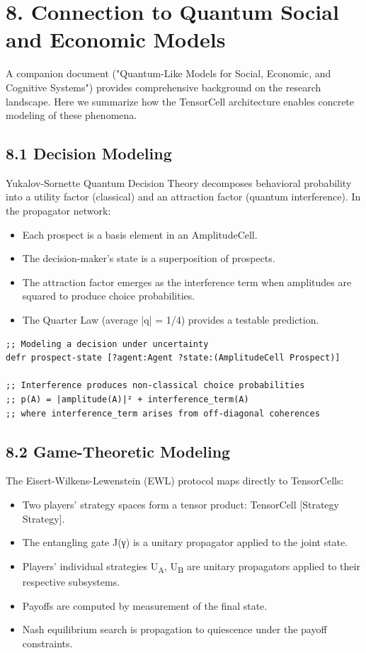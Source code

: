 \documentclass[11pt]{article}
\begin{document}
\section{8. Connection to Quantum Social and Economic Models}
\label{sec:org4938a41}

A companion document ("Quantum-Like Models for Social, Economic, and Cognitive
Systems") provides comprehensive background on the research landscape. Here we
summarize how the TensorCell architecture enables concrete modeling of these
phenomena.
\subsection{8.1 Decision Modeling}
\label{sec:org8758d31}

Yukalov-Sornette Quantum Decision Theory decomposes behavioral probability into
a utility factor (classical) and an attraction factor (quantum interference).
In the propagator network:

\begin{itemize}
\item Each prospect is a basis element in an AmplitudeCell.
\item The decision-maker's state is a superposition of prospects.
\item The attraction factor emerges as the interference term when amplitudes are
squared to produce choice probabilities.
\item The Quarter Law (average |q| = 1/4) provides a testable prediction.
\end{itemize}

\begin{verbatim}
;; Modeling a decision under uncertainty
defr prospect-state [?agent:Agent ?state:(AmplitudeCell Prospect)]

;; Interference produces non-classical choice probabilities
;; p(A) = |amplitude(A)|² + interference_term(A)
;; where interference_term arises from off-diagonal coherences
\end{verbatim}
\subsection{8.2 Game-Theoretic Modeling}
\label{sec:orgf97fdd6}

The Eisert-Wilkens-Lewenstein (EWL) protocol maps directly to TensorCells:

\begin{itemize}
\item Two players' strategy spaces form a tensor product: TensorCell [Strategy Strategy].
\item The entangling gate J(γ) is a unitary propagator applied to the joint state.
\item Players' individual strategies U\textsubscript{A}, U\textsubscript{B} are unitary propagators applied to
their respective subsystems.
\item Payoffs are computed by measurement of the final state.
\item Nash equilibrium search is propagation to quiescence under the payoff constraints.
\end{itemize}
\end{document}
